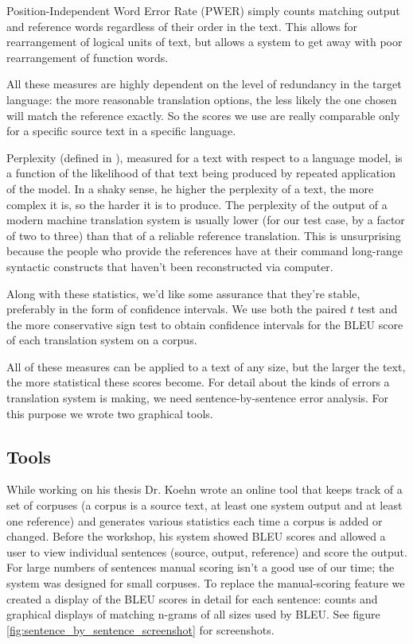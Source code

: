 \documentclass[11pt]{book}
\theoremstyle{plain}
\begin{document}
Position-Independent Word Error Rate (PWER) simply counts matching output and reference words regardless of their order in the text. This allows for rearrangement of logical units of text, but allows a system to get away with poor rearrangement of function words.

All these measures are highly dependent on the level of redundancy in the target language: the more reasonable translation options, the less likely the one chosen will match the reference exactly. So the scores we use are really comparable only for a specific source text in a specific language.

Perplexity (defined in \cite{perplexity}), measured for a text with respect to a language model, is a function of the likelihood of that text being produced by repeated application of the model. In a shaky sense, he higher the perplexity of a text, the more complex it is, so the harder it is to produce. The perplexity of the output of a modern machine translation system is usually lower (for our test case, by a factor of two to three) than that of a reliable reference translation. This is unsurprising because the people who provide the references have at their command long-range syntactic constructs that haven't been reconstructed via computer.

Along with these statistics, we'd like some assurance that they're stable, preferably in the form of confidence intervals. We use both the paired $t$ test and the more conservative sign test to obtain confidence intervals for the BLEU score of each translation system on a corpus.

All of these measures can be applied to a text of any size, but the larger the text, the more statistical these scores become. For detail about the kinds of errors a translation system is making, we need sentence-by-sentence error analysis. For this purpose we wrote two graphical tools.

\subsection{Tools}
While working on his thesis Dr. Koehn wrote an online tool that keeps track of a set of corpuses (a corpus is a source text, at least one system output and at least one reference) and generates various statistics each time a corpus is added or changed. Before the workshop, his system showed BLEU scores and allowed a user to view individual sentences (source, output, reference) and score the output. For large numbers of sentences manual scoring isn't a good use of our time; the system was designed for small corpuses. To replace the manual-scoring feature we created a display of the BLEU scores in detail for each sentence: counts and graphical displays of matching n-grams of all sizes used by BLEU. See figure \ref{fig:sentence_by_sentence_screenshot} for screenshots.
\end{document}
